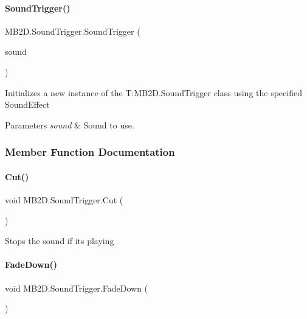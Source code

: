 \paragraph{\texorpdfstring{Sound\+Trigger()}{SoundTrigger()}}
{\footnotesize\ttfamily M\+B2\+D.\+Sound\+Trigger.\+Sound\+Trigger (\begin{DoxyParamCaption}\item[{Sound\+Effect}]{sound }\end{DoxyParamCaption})\hspace{0.3cm}{\ttfamily [inline]}}



Initializes a new instance of the T\+:\+M\+B2\+D.\+Sound\+Trigger class using the specified Sound\+Effect 


\begin{DoxyParams}{Parameters}
{\em sound} & Sound to use.\\
\hline
\end{DoxyParams}


\subsubsection{Member Function Documentation}
\hypertarget{class_m_b2_d_1_1_sound_trigger_ae8846b39ac8469f479f8d64cbec25a11}{}\label{class_m_b2_d_1_1_sound_trigger_ae8846b39ac8469f479f8d64cbec25a11} 
\paragraph{\texorpdfstring{Cut()}{Cut()}}
{\footnotesize\ttfamily void M\+B2\+D.\+Sound\+Trigger.\+Cut (\begin{DoxyParamCaption}{ }\end{DoxyParamCaption})\hspace{0.3cm}{\ttfamily [inline]}}



Stops the sound if it\textquotesingle{}s playing 

\hypertarget{class_m_b2_d_1_1_sound_trigger_aca40e191ef7b6cd594d43bb36ae787e9}{}\label{class_m_b2_d_1_1_sound_trigger_aca40e191ef7b6cd594d43bb36ae787e9} 
\paragraph{\texorpdfstring{Fade\+Down()}{FadeDown()}}
{\footnotesize\ttfamily void M\+B2\+D.\+Sound\+Trigger.\+Fade\+Down (\begin{DoxyParamCaption}{ }\end{DoxyParamCaption})\hspace{0.3cm}{\ttfamily [inline]}}



